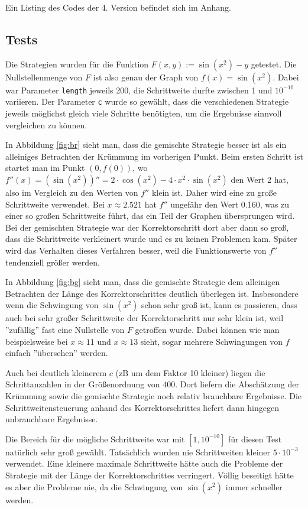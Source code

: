 \documentclass[a4paper,11pt,bibliography=totoc,listof=totoc,headinclude=true,cleardoublepage=empty,oneside]{scrartcl}
\begin{document}
Ein Listing des Codes der 4. Version befindet sich im Anhang. 

\subsection{Tests}
Die Strategien wurden für die Funktion $F(x,y) := \sin(x^2)-y$ getestet. Die Nullstellenmenge von $F$ ist also genau der Graph von $f(x)=\sin(x^2)$. Dabei war Parameter \verb|length| jeweils 200, die Schrittweite durfte zwischen 1 und $10^{-10}$ variieren. Der Parameter \verb|c| wurde so gewählt, dass die verschiedenen Strategie jeweils möglichst gleich viele Schritte benötigten, um die Ergebnisse sinnvoll vergleichen zu können.

In Abbildung \ref{fig:br} sieht man, dass die gemischte Strategie besser ist als ein alleiniges Betrachten der Krümmung im vorherigen Punkt. Beim ersten Schritt ist startet man im Punkt $(0,f(0))$, wo $f''(x) = (\sin(x^2))''= 2\cdot \cos(x^2) - 4\cdot x^2 \cdot \sin(x^2)$ den Wert 2 hat, also im Vergleich zu den Werten von $f''$ klein ist. Daher wird eine zu große Schrittweite verwendet. Bei $x\approx2.521$ hat $f''$ ungefähr den Wert 0.160, was zu einer so großen Schrittweite führt, das ein Teil der Graphen übersprungen wird. Bei der gemischten Strategie war der Korrektorschritt dort aber dann so groß, dass die Schrittweite verkleinert wurde und es zu keinen Problemen kam. Später wird das Verhalten dieses Verfahren besser, weil die Funktionswerte von $f''$ tendenziell größer werden.

In Abbildung \ref{fig:bg} sieht man, dass die gemischte Strategie dem alleinigen Betrachten der Länge des Korrektorschrittes deutlich überlegen ist. Insbesondere wenn die Schwingung von $\sin(x^2)$ schon sehr groß ist, kann es passieren, dass auch bei sehr großer Schrittweite der Korrektorschritt nur sehr klein ist, weil ''zufällig'' fast eine Nullstelle von $F$ getroffen wurde. Dabei können wie man beispielsweise bei $x\approx11$ und $x\approx13$ sieht, sogar mehrere Schwingungen von $f$ einfach ''übersehen'' werden.

Auch bei deutlich kleinerem $c$ (zB um dem Faktor 10 kleiner) liegen die Schrittanzahlen in der Größenordnung von 400. Dort liefern die Abschätzung der Krümmung sowie die gemischte Strategie noch relativ brauchbare Ergebnisse. Die Schrittweitensteuerung anhand des Korrektorschrittes liefert dann hingegen unbrauchbare Ergebnisse.

Die Bereich für die mögliche Schrittweite war mit $[1,10^{-10}]$ für diesen Test natürlich sehr groß gewählt. Tatsächlich wurden nie Schrittweiten kleiner $5\cdot 10^{-3}$ verwendet. Eine kleinere maximale Schrittweite hätte auch die Probleme der Strategie mit der Länge der Korrektorschrittes verringert. Völlig beseitigt hätte es aber die Probleme nie, da die Schwingung von $\sin(x^2)$ immer schneller werden.
\end{document}
